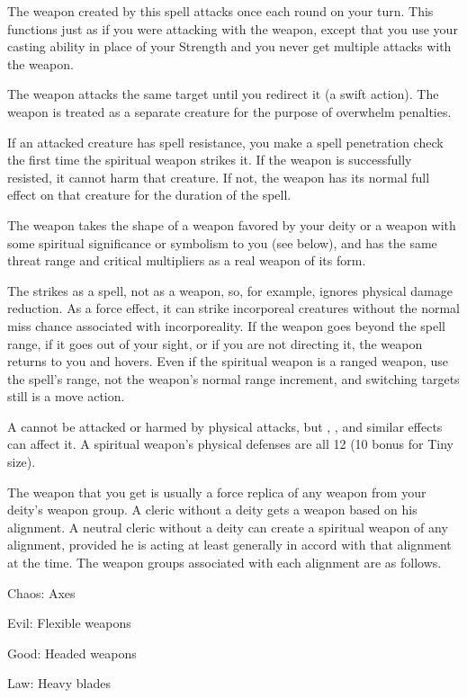 \spellrng{\rngmed}
\begin{spelleffect}
  The weapon created by this spell attacks once each round on your turn. This functions just as if you were attacking with the weapon, except that you use your casting ability in place of your Strength and you never get multiple attacks with the weapon.
  \par The weapon attacks the same target until you redirect it (a swift action). The weapon is treated as a separate creature for the purpose of overwhelm penalties.
  \par If an attacked creature has spell resistance, you make a spell penetration check the first time the spiritual weapon strikes it. If the weapon is successfully resisted, it cannot harm that creature. If not, the weapon has its normal full effect on that creature for the duration of the spell.
  \par The weapon takes the shape of a weapon favored by your deity or a weapon with some spiritual significance or symbolism to you (see below), and has the same threat range and critical multipliers as a real weapon of its form.
\end{spelleffect}
\begin{spellnotes}
  The  strikes as a spell, not as a weapon, so, for example, ignores physical damage reduction. As a force effect, it can strike incorporeal creatures without the normal miss chance associated with incorporeality. If the weapon goes beyond the spell range, if it goes out of your sight, or if you are not directing it, the weapon returns to you and hovers. Even if the spiritual weapon is a ranged weapon, use the spell's range, not the weapon's normal range increment, and switching targets still is a move action.
  \par A  cannot be attacked or harmed by physical attacks, but , , and similar effects can affect it. A spiritual weapon's physical defenses are all 12 (10 \add {} bonus for Tiny size).
  \par The weapon that you get is usually a force replica of any weapon from your deity's weapon group. A cleric without a deity gets a weapon based on his alignment. A neutral cleric without a deity can create a spiritual weapon of any alignment, provided he is acting at least generally in accord with that alignment at the time. The weapon groups associated with each alignment are as follows.
  \par Chaos: Axes
  \par Evil: Flexible weapons
  \par Good: Headed weapons
  \par Law: Heavy blades
\end{spellnotes}

